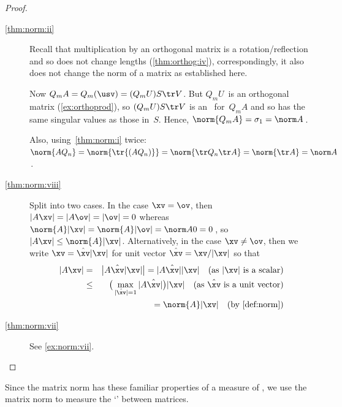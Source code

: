 \begin{proof}
\begin{description}
\item[\ref{thm:norm:ii}]
Recall that multiplication by an orthogonal matrix is a rotation\slash reflection and so does not change lengths (\cref{thm:orthog:iv}), correspondingly, it also does not change the norm of a matrix as established here.

Now \(Q_mA=Q_m(\usv)=(Q_mU)S\tr V\).
But \(Q_mU\)~is an orthogonal matrix (\cref{ex:orthoprod}),
so \((Q_mU)S\tr V\) is an \svd\ for~\(Q_mA\) and so has the same singular values as those in~\(S\).
Hence, \(\norm{Q_mA}=\sigma_1=\norm A\)\,.

Also, using~\ref{thm:norm:i} twice: \(\norm{AQ_n}=\norm{\tr{(AQ_n)}}=\norm{\tr Q_n\tr A}=\norm{\tr A}=\norm A\)\,.

\item[\ref{thm:norm:viii}]
Split into two cases.
In the case \(\xv=\ov\), then \(|A\xv|=|A\ov|=|\ov|=0\) whereas \(\norm{A}|\xv|=\norm{A}|\ov|=\norm A0=0\)\,, so \(|A\xv|\leq\norm{A}|\xv|\).
Alternatively, in the case \(\xv\neq\ov\), then we write \(\xv=\hat{\xv}|\xv|\) for unit vector \(\hat{\xv}=\xv/|\xv|\)  so that
\begin{eqnarray*}
|A\xv|&=&\big|A\hat{\xv}|\xv|\big|
=|A\hat{\xv}||\xv| \quad(\text{as }|\xv|\text{ is a scalar})
\\&\leq&\big(\max_{|\hat{\xv}|=1}|A\hat{\xv}|\big)|\xv|
\quad(\text{as }\hat{\xv}\text{ is a unit vector})
\\&&{}=\norm{A}|\xv|\quad(\text{by \cref{def:norm}})
\end{eqnarray*}


\item[\ref{thm:norm:vii}] See \cref{ex:norm:vii}. 
\end{description}
\end{proof}




Since the matrix norm has these familiar properties of a measure of , we use the matrix norm to measure the `' between matrices.

